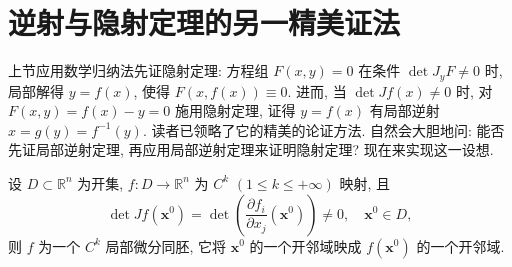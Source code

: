 \section{逆射与隐射定理的另一精美证法}\label{sec:8.5}

上节应用数学归纳法先证隐射定理: 方程组 $F(x,y) = 0$ 在条件 $\det J_{y}F \neq 0$ 时, 局部解得 $y = f(x)$, 使得 $F(x,f(x)) \equiv 0$. 进而, 当 $\det Jf(x) \neq 0$ 时, 对 $F(x,y) = f(x) - y = 0$ 施用隐射定理, 证得 $y = f(x)$ 有局部逆射 $x = g(y) = f^{-1}(y)$. 读者已领略了它的精美的论证方法. 自然会大胆地问: 能否先证局部逆射定理, 再应用局部逆射定理来证明隐射定理? 现在来实现这一设想.

\begin{theorem}[局部逆射定理]\label{thm:8.5.1}
设 $D \subset \mathbb{R}^{n}$ 为开集, $f: D \to \mathbb{R}^{n}$ 为 $C^{k}$ $(1 \leqslant k \leqslant +\infty)$ 映射, 且
\[
  \det Jf(\boldsymbol{x}^{0}) = \det\left(\frac{\partial f_{i}}{\partial x_{j}}(\boldsymbol{x}^{0})\right) \neq 0, \quad \boldsymbol{x}^{0} \in D,
\]
则 $f$ 为一个 $C^{k}$ 局部微分同胚, 它将 $\boldsymbol{x}^{0}$ 的一个开邻域映成 $f(\boldsymbol{x}^{0})$ 的一个开邻域.
\end{theorem}

